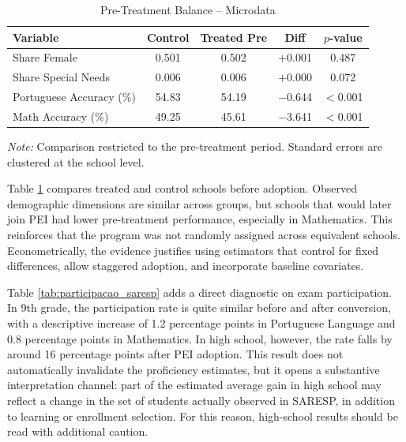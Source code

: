 \begin{table}[htbp]
\centering
\caption{Pre-Treatment Balance -- Microdata}
\label{tab:balanco}
\small
\begin{threeparttable}
\begin{tabular}{lcccc}
\toprule
Variable & Control & Treated Pre & Diff & $p$-value \\
\midrule
Share Female              & 0.501 & 0.502 & $+$0.001 & 0.487 \\
Share Special Needs       & 0.006 & 0.006 & $+$0.000 & 0.072 \\
Portuguese Accuracy (\%)  & 54.83 & 54.19 & $-$0.644 & $<$0.001 \\
Math Accuracy (\%)        & 49.25 & 45.61 & $-$3.641 & $<$0.001 \\
\bottomrule
\end{tabular}
\begin{tablenotes}
\footnotesize
\item \textit{Note:} Comparison restricted to the pre-treatment period. Standard errors are clustered at the school level.
\end{tablenotes}
\end{threeparttable}
\end{table}

Table \ref{tab:balanco} compares treated and control schools before adoption. Observed demographic dimensions are similar across groups, but schools that would later join PEI had lower pre-treatment performance, especially in Mathematics. This reinforces that the program was not randomly assigned across equivalent schools. Econometrically, the evidence justifies using estimators that control for fixed differences, allow staggered adoption, and incorporate baseline covariates.

Table \ref{tab:participacao_saresp} adds a direct diagnostic on exam participation. In 9th grade, the participation rate is quite similar before and after conversion, with a descriptive increase of 1.2 percentage points in Portuguese Language and 0.8 percentage points in Mathematics. In high school, however, the rate falls by around 16 percentage points after PEI adoption. This result does not automatically invalidate the proficiency estimates, but it opens a substantive interpretation channel: part of the estimated average gain in high school may reflect a change in the set of students actually observed in SARESP, in addition to learning or enrollment selection. For this reason, high-school results should be read with additional caution.

